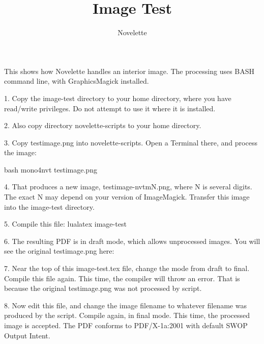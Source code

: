 \documentclass{novelette} %
\title{Image Test}
\author{Novelette}
\begin{document}
This shows how Novelette handles an interior image. The processing
uses BASH command line, with GraphicsMagick installed.

1. Copy the image-test directory to your home directory, where you
have read/write privileges. Do not attempt to use it where it is installed.

2. Also copy directory novelette-scripts to your home directory.

3. Copy testimage.png into novelette-scripts. Open a Terminal
there, and process the image:

bash mono4nvt testimage.png

4. That produces a new image, testimage-nvtmN.png, where N is several
digits. The exact N may depend on your version of ImageMagick. Transfer this
image into the image-test directory.

5. Compile this file: lualatex image-test

6. The resulting PDF is in draft mode, which allows unprocessed images.
You will see the original testimage.png here:


7. Near the top of this image-test.tex file, change the mode from
draft to final. Compile this file again. This time, the compiler will throw
an error. That is because the original testimage.png was not processed
by script.

8. Now edit this file, and change the image filename
to whatever filename was produced by the script. Compile again, in final
mode. This time, the processed image is accepted. The PDF conforms to
PDF/X-1a:2001 with default SWOP Output Intent.

\makeatletter\nocle@rtoendtrue\makeatother
\end{document}
